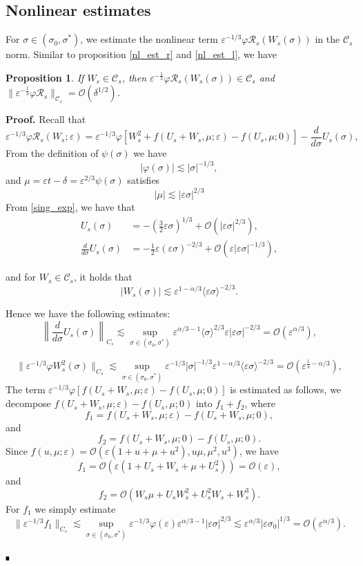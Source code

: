 \documentclass[letterpaper,11pt]{article}
\newcommand{\Ral}{\mathcal{R}}
\newcommand{\rmO}{\mathcal{O}}
\newcommand{\eps}{\varepsilon}
\newcommand{\lar}{ \lesssim }
\numberwithin{equation}{section}
\theoremstyle{plain}
\newtheorem{proposition}[theorem]{Proposition}
\newenvironment{Proof}[1][.]%
 {\begin{trivlist}\item[]\textbf{Proof#1 }}%
 {\hspace*{\fill}$\rule{0.3\baselineskip}{0.35\baselineskip}$\end{trivlist}}
\begin{document}
\subsection{Nonlinear estimates}
For $\sigma \in (\sigma_0, \sigma^*)$, we estimate the nonlinear term $\eps^{-1/3}\varphi \Ral_s(W_s(\sigma))$ in the $\mathcal{C}_s$ norm. Similar to proposition \ref{nl_est_r} and \ref{nl_est_l}, we have
\begin{proposition}\label{nl_est_s} If $W_s \in \mathcal{C}_s$, then $\eps^{-\frac{1}{3}}\varphi \Ral_s(W_s(\sigma))  \in \mathcal{C}_{s}$ and $\| \eps^{-\frac{1}{3}}\varphi \Ral_s \|_{\mathcal{C}_s} = \rmO(\delta^{1/2})$.
\end{proposition}

\begin{Proof}
Recall that
\[
\eps^{-1/3}\varphi\Ral_s(W_s;\eps) = \eps^{-1/3}\varphi\left[  W_s^2+ f(U_s+W_s, \mu ; \eps)-f(U_s,\mu;0) \right]- \frac{d}{d\sigma}U_s(\sigma),
\]
From the definition of $\psi(\sigma)$ we have
\[
|\varphi(\sigma)|  \lar | \sigma |^{-1/3},
\]
and $\mu = \eps t -\delta = \eps^{2/3} \psi(\sigma)$ satisfies
\[
|\mu | \lar |\eps\sigma|^{2/3}
\] 
From \eqref{sing_exp}, we have that
\begin{align*}
U_s(\sigma)  &= -\left(\frac{3}{2}\eps \sigma\right)^{1/3} + \rmO(|\eps \sigma|^{2/3} ),
\\
\frac{d}{d\sigma}U_s(\sigma) &= -\frac{1}{2}\eps(\eps\sigma)^{-2/3} + \rmO(\eps|\eps \sigma|^{-1/3}),
\end{align*}

and for $W_s \in \mathcal{C}_s$, it holds that
\[
|W_s(\sigma)| \lar \eps^{1-\alpha/3}\langle \eps \sigma\rangle^{-2/3}.
\]

Hence we have the following estimates:
\[
\left\|\frac{d}{d\sigma}U_s(\sigma) \right\|_{C_s}  \lar \sup_{\sigma \in (\sigma_0, \sigma^{*})}\eps^{\alpha/3-1}\langle \sigma\rangle^{2/3} \eps|\eps \sigma|^{-2/3} = \rmO(\eps^{\alpha/3}),
\]

\[
\|\eps^{-1/3}\varphi W_s^2(\sigma) \|_{C_s}  \lar \sup_{\sigma \in (\sigma_0, \sigma^{*})}\eps^{-1/3}|\sigma|^{-1/3}\eps^{1-\alpha/3}\langle \eps \sigma\rangle^{-2/3} = \rmO(\eps^{\frac{1}{4}-\alpha/3}),
\]
The term $\eps^{-1/3}\varphi[ f(U_s+W_s, \mu; \eps)-f(U_s,\mu; 0) ]$ is estimated as follows, we decompose $f(U_s+W_s,\mu;\eps)-f(U_s,\mu;0)$ into $f_1 + f_2$, where
\[
f_1 = f(U_s+W_s,\mu;\eps) - f(U_s+W_s,\mu;0),
\]
and 
\[
f_2 = f(U_s+W_s,\mu;0)  - f(U_s, \mu; 0).
\]
Since $f(u,\mu ; \eps) = \rmO(\eps(1+u+\mu+u^2), u\mu,\mu^2,u^3)$, we have
\[
f_1 = \rmO(\eps(1+U_s+W_s+\mu+U_s^2)) = \rmO(\eps),
\]
and 
\[
f_2 = \rmO( W_s\mu + U_sW_s^2+U_s^2W_s+W_s^3).
\]
For $f_1$ we simply estimate
\[
\| \eps^{-1/3}f_1\|_{C_s} \lar \sup_{\sigma \in (\sigma_0, \sigma^{*})} \eps^{-1/3}\varphi (\eps) \eps^{\alpha/3-1}|\eps\sigma|^{2/3} \lar \eps^{\alpha/3}|\eps\sigma_0|^{1/3} = \rmO(\eps^{\alpha/3}).
\]


\end{Proof}
\end{document}
